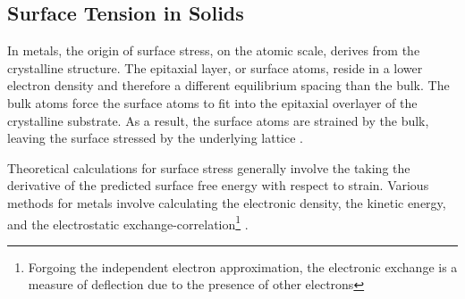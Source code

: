 %

\subsection{Surface Tension in Solids}
In metals, the origin of surface stress, on the atomic scale, derives from the crystalline structure. The epitaxial layer, or surface atoms, reside in a lower electron density and therefore a different equilibrium spacing than the bulk. The bulk atoms force the surface atoms to fit into the epitaxial overlayer of the crystalline substrate. As a result, the surface atoms are strained by the bulk, leaving the surface stressed by the underlying lattice \cite{cammarata1994surface}. 

Theoretical calculations for surface stress generally involve the taking the derivative of the predicted surface free energy with respect to strain. Various methods for metals involve calculating the electronic density, the kinetic energy, and the electrostatic exchange-correlation\footnote{Forgoing the independent electron approximation, the electronic exchange is a measure of deflection due to the presence of other electrons} \cite{GURTIN1978431}. 


